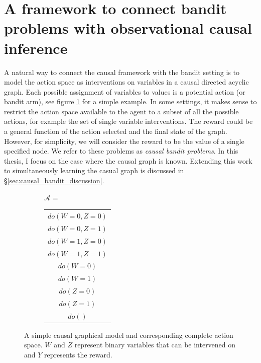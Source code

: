 \documentclass[11pt,a4paper,twoside]{report}
\newcommand{\actionspace}{\mathcal{A}}
\theoremstyle{plain}
\theoremstyle{definition}
\begin{document}
\section{A framework to connect bandit problems with observational causal inference}
\label{sec:intro_causal_bandit}
A natural way to connect the causal framework with the bandit setting is to model the action space as interventions on variables in a causal directed acyclic graph. Each possible assignment of variables to values is a potential action (or bandit arm), see figure \ref{fig:unify_frameworks} for a simple example. In some settings, it makes sense to restrict the action space available to the agent to a subset of all the possible actions, for example the set of single variable interventions. The reward could be a general function of the action selected and the final state of the graph. However, for simplicity, we will consider the reward to be the value of a single specified node. We refer to these problems as \emph{causal bandit problems}. In this thesis, I focus on the case where the causal graph is known. Extending this work to simultaneously learning the casual graph is discussed in \S\ref{sec:causal_bandit_discussion}.

\begin{figure}
\centering
\begin{subfigure}[c]{0.3\textwidth}
\end{subfigure}
\begin{subfigure}[t]{0.4\textwidth}
$\actionspace$ = \begin{tabular}{|c|}
	\hline
  $do(W=0,Z=0)$ \\
  $do(W=0,Z=1)$ \\
  $do(W=1,Z=0)$ \\
  $do(W=1,Z=1)$ \\
  \hline
  $do(W=0)$ \\
  $do(W=1)$ \\
  $do(Z=0)$ \\
  $do(Z=1)$ \\
  $do()$ \\
  \hline
\end{tabular}
\end{subfigure}
\caption{A simple causal graphical model and corresponding complete action space. $W$ and $Z$ represent binary variables that can be intervened on and $Y$ represents the reward.}
\label{fig:unify_frameworks}
\end{figure} 
\end{document}
